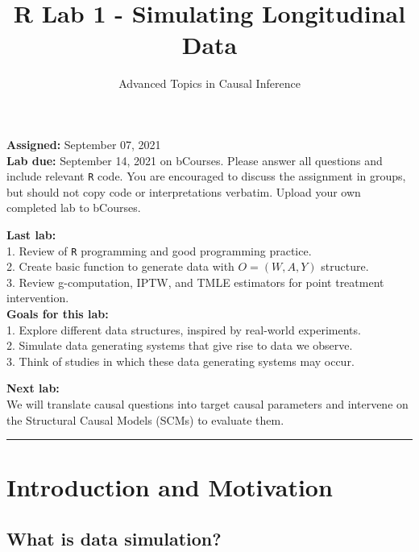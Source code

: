 \documentclass{exam}
\title{R Lab 1 - Simulating Longitudinal Data}
\author{Advanced Topics in Causal Inference}
\date{}
\begin{document}
\maketitle



\maketitle
\noindent \textbf{Assigned:} September 07, 2021\\
\textbf{Lab due:} September 14, 2021 on bCourses. Please answer all questions and include relevant \texttt{R} code. You are encouraged to discuss the assignment in groups, but should not copy code or interpretations verbatim. Upload your own completed lab to bCourses.



\noindent \textbf{Last lab:} \\ 
1. Review of \texttt{R} programming and good programming practice. \\
2. Create basic function to generate data with $O = (W, A, Y)$ structure. \\
3. Review g-computation, IPTW, and TMLE estimators for point treatment intervention. \\


\noindent \textbf{Goals for this lab:} \\
1. Explore different data structures, inspired by real-world experiments. \\
2. Simulate data generating systems that give rise to data we observe. \\
3. Think of studies in which these data generating systems may occur.


\noindent \textbf{Next lab:}\\
We will translate causal questions into target causal parameters and intervene on the Structural Causal Models (SCMs) to evaluate them. 

\begin{center}
\noindent\rule{18cm}{0.4pt}
\end{center}

\section{Introduction and Motivation}

\subsection{What is data simulation?}
\end{document}
